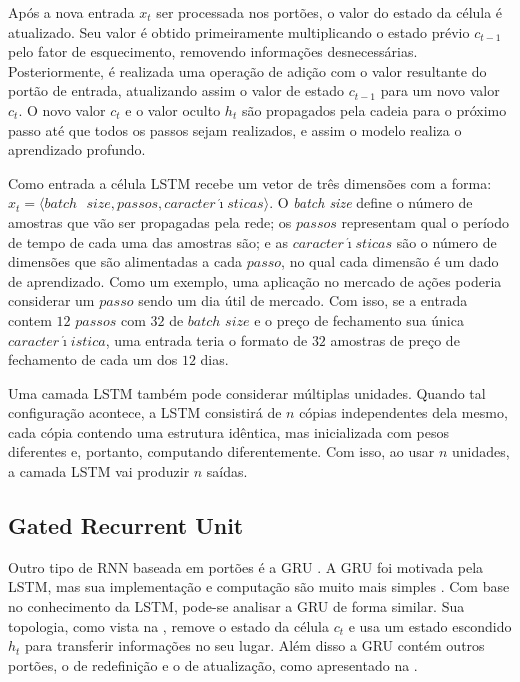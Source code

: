 Após a nova entrada $x_t$ ser processada nos portões, o valor do estado da célula é atualizado. Seu valor é obtido primeiramente multiplicando o estado prévio $c_{t-1}$ pelo fator de esquecimento, removendo informações desnecessárias. Posteriormente, é realizada uma operação de adição com o valor resultante do portão de entrada, atualizando assim o valor de estado $c_{t-1}$ para um novo valor $c_{t}$. O novo valor $c_t$ e o valor oculto $h_t$ são propagados pela cadeia para o próximo passo até que todos os passos sejam realizados, e assim o modelo realiza o aprendizado profundo.

Como entrada a célula LSTM recebe um vetor de três dimensões com a forma: $x_t = \langle {batch\textrm{ }size, passos, caracter\acute{\imath}sticas} \rangle$. O \emph{batch size} define o número de amostras que vão ser propagadas pela rede; os $passos$ representam qual o período de tempo de cada uma das amostras são; e as $caracter\acute{\imath}sticas$ são o número de dimensões que são alimentadas a cada $passo$, no qual cada dimensão é um dado de aprendizado. Como um exemplo, uma aplicação no mercado de ações poderia considerar um $passo$ sendo um dia útil de mercado. Com isso, se a entrada contem $12$ $passos$ com $32$ de $batch$ $size$ e o preço de fechamento sua única $caracter\acute{\imath}istica$, uma entrada teria o formato de $32$ amostras de preço de fechamento de cada um dos $12$ dias.

Uma camada LSTM também pode considerar múltiplas unidades. Quando tal configuração acontece, a LSTM consistirá de $n$ cópias independentes dela mesmo, cada cópia contendo uma estrutura idêntica, mas inicializada com pesos diferentes e, portanto, computando diferentemente. Com isso, ao usar $n$ unidades, a camada LSTM vai produzir $n$ saídas. 

\subsection{Gated Recurrent Unit}
\label{sec:gru}

Outro tipo de \acrshort{RNN} baseada em portões é a \acrfull{GRU} \cite{gru}. A \acrshort{GRU} foi motivada pela \acrshort{LSTM}, mas sua implementação e computação são muito mais simples \cite{gru}. Com base no conhecimento da \acrshort{LSTM}, pode-se analisar a \acrshort{GRU} de forma similar. Sua topologia, como vista na , remove o estado da célula $c_t$ e usa um estado escondido $h_t$ para transferir informações no seu lugar. Além disso a \acrshort{GRU} contém outros portões, o de redefinição e o de atualização, como apresentado na .

